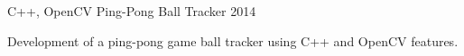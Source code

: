 \begin{cventries}

  \cventry
    {C++, OpenCV} %
    {Ping-Pong Ball Tracker} %
    {} %
    {2014} %
    {
      \begin{cvitems} %
        \item {Development of a ping-pong game ball tracker using C++ and OpenCV features.}
      \end{cvitems}
    }

\end{cventries}
